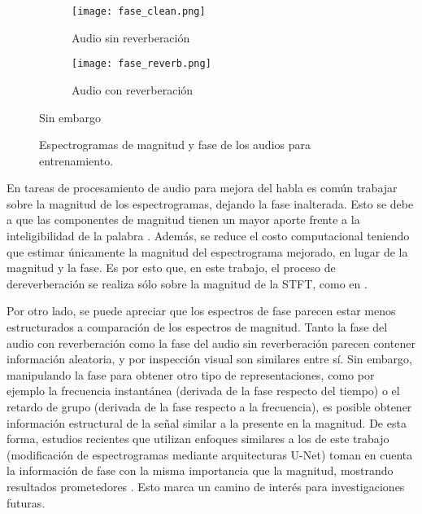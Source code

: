 \begin{figure}[H]
\centering
\begin{subfigure}{.5\textwidth}
  \centering
  \texttt{[image: fase\_clean.png]}
  \caption{Audio sin reverberación}
  \label{fig:fase_sub1}
\end{subfigure}%
\begin{subfigure}{.5\textwidth}
  \centering
  \texttt{[image: fase\_reverb.png]}
  \caption{Audio con reverberación}
  \label{fig:fase_sub2}
\end{subfigure}Sin embargo
\caption{Espectrogramas de magnitud y fase de los audios para entrenamiento.}
\label{fig:fases}
\end{figure} 

En tareas de procesamiento de audio para mejora del habla es común trabajar sobre la magnitud de los espectrogramas, dejando la fase inalterada. Esto se debe a que las componentes de magnitud tienen un mayor aporte frente a la inteligibilidad de la palabra \cite{phase_book, unphase}. Además, se reduce el costo computacional teniendo que estimar únicamente la magnitud del espectrograma mejorado, en lugar de la magnitud y la fase.  Es por esto que, en este trabajo, el proceso de dereverberación se realiza sólo sobre la magnitud de la STFT, como en \cite{CNN, FCN, skip, rir_filtinverso}. 

Por otro lado, se puede apreciar que los espectros de fase parecen estar menos estructurados a comparación de los espectros de magnitud. Tanto la fase del audio con reverberación como la fase del audio sin reverberación parecen contener información aleatoria, y por inspección visual son similares entre sí. Sin embargo, manipulando la fase para obtener otro tipo de representaciones, como por ejemplo la frecuencia instantánea (derivada de la fase respecto del tiempo) o el retardo de grupo (derivada de la fase respecto a la frecuencia), es posible obtener información estructural de la señal similar a la presente en la magnitud. De esta forma, estudios recientes que utilizan enfoques similares a los de este trabajo (modificación de espectrogramas mediante arquitecturas U-Net) toman en cuenta la información de fase con la misma importancia que la magnitud, mostrando resultados prometedores \cite{phaseaware}. Esto marca un camino de interés para investigaciones futuras. 

